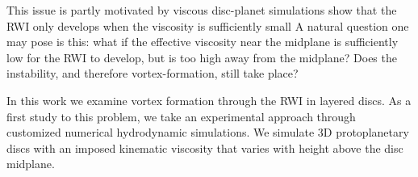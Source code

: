 \documentclass[useAMS,usenatbib]{mn2e}
\begin{document}
This issue is partly motivated by viscous disc-planet
simulations show that the RWI only develops when the viscosity is
sufficiently small \citep{valborro07}%
A natural question one may pose is this: what if the effective 
viscosity near the midplane is sufficiently low for the RWI to
develop, but is too high away from the midplane? Does the
instability, and therefore vortex-formation, still take place? 

In this work we examine vortex formation through the RWI in
layered discs. As a first study to this problem, we take an
experimental approach through customized numerical hydrodynamic
simulations. We simulate 3D protoplanetary discs with an imposed
kinematic viscosity that varies with height above the disc
midplane. %

















 \appendix
% 
%
\end{document}
